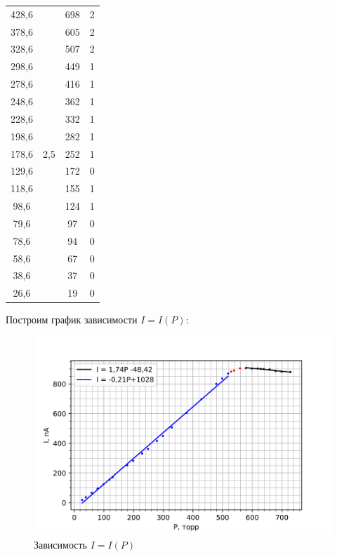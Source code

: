 \documentclass[a4paper,12pt]{report}
\begin{document}
\begin{table}[H]
\begin{tabular}{|c|c|c|c|}
428,6   & \multirow{17}{*}{2,5} & 698  & 2         \\ \cline{1-1} \cline{3-4} 
378,6   &                       & 605  & 2         \\ \cline{1-1} \cline{3-4} 
328,6   &                       & 507  & 2         \\ \cline{1-1} \cline{3-4} 
298,6   &                       & 449  & 1         \\ \cline{1-1} \cline{3-4} 
278,6   &                       & 416  & 1         \\ \cline{1-1} \cline{3-4} 
248,6   &                       & 362  & 1         \\ \cline{1-1} \cline{3-4} 
228,6   &                       & 332  & 1         \\ \cline{1-1} \cline{3-4} 
198,6   &                       & 282  & 1         \\ \cline{1-1} \cline{3-4} 
178,6   &                       & 252  & 1         \\ \cline{1-1} \cline{3-4} 
129,6   &                       & 172  & 0         \\ \cline{1-1} \cline{3-4} 
118,6   &                       & 155  & 1         \\ \cline{1-1} \cline{3-4} 
98,6    &                       & 124  & 1         \\ \cline{1-1} \cline{3-4} 
79,6    &                       & 97   & 0         \\ \cline{1-1} \cline{3-4} 
78,6    &                       & 94   & 0         \\ \cline{1-1} \cline{3-4} 
58,6    &                       & 67   & 0         \\ \cline{1-1} \cline{3-4} 
38,6    &                       & 37   & 0         \\ \cline{1-1} \cline{3-4} 
26,6    &                       & 19   & 0         \\ \hline
\end{tabular}
\end{table}

Построим график зависимости $I = I(P)$:

	\begin{figure}[H]
		\centering
		\includegraphics[width=0.7\linewidth]{I(P).png}
		\caption{Зависимость $I = I(P)$}
	\end{figure}
\end{document}
